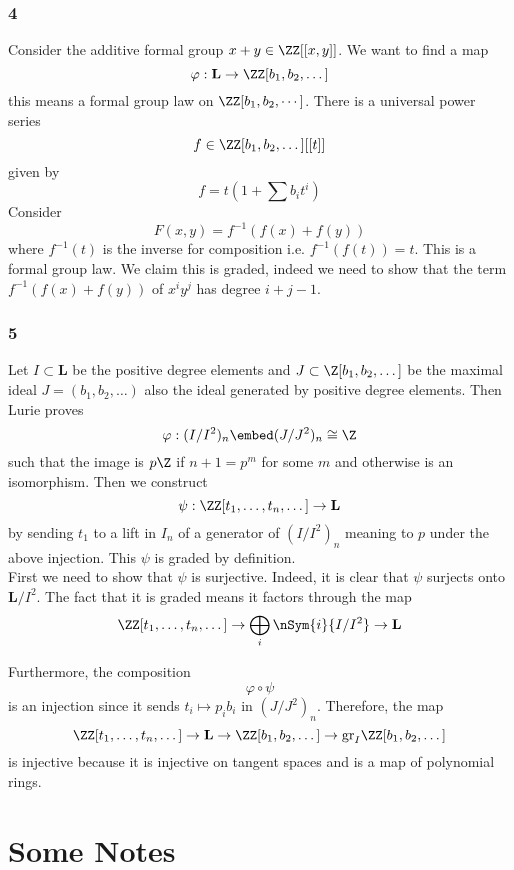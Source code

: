 \documentclass{article}
\newcommand{\LL}{\mathbf{L}}
\begin{document}
\subsubsection{4}

Consider the additive formal group $x + y \in \ZZ[[x,y]]$. We want to find a map
\[ \varphi : \LL \to \ZZ[b_1, b_2, \dots] \]
this means a formal group law on $\ZZ[b_1, b_2, \cdots]$. There is a universal power series
\[ f \in \ZZ[b_1, b_2, \dots][[t]] \]
given by
\[ f = t(1 + \sum b_i t^i) \]
Consider
\[ F(x,y) = f^{-1}(f(x) + f(y)) \]
where $f^{-1}(t)$ is the inverse for composition i.e. $f^{-1}(f(t)) = t$. This is a formal group law. We claim this is graded, indeed we need to show that the term $f^{-1}(f(x) + f(y))$ of $x^i y^j$ has degree $i + j - 1$.

\subsubsection{5}

Let $I \subset \LL$ be the positive degree elements and $J \subset \Z[b_1, b_2, \dots]$ be the maximal ideal $J = (b_1, b_2, \dots)$ also the ideal generated by positive degree elements. Then Lurie proves
\[ \varphi : (I/I^2)_n \embed (J/J^2)_n \cong \Z \]
such that the image is $p \Z$ if $n + 1 = p^m$ for some $m$ and otherwise is an isomorphism. 
Then we construct
\[ \psi : \ZZ[t_1, \dots, t_n, \dots] \to \LL \]
by sending $t_1$ to a lift in $I_n$ of a generator of $(I/I^2)_n$ meaning to $p$ under the above injection. This $\psi$ is graded by definition.
\bigskip\\
First we need to show that $\psi$ is surjective. Indeed, it is clear that $\psi$ surjects onto $\LL / I^2$. The fact that it is graded means it factors through the map
\[ \ZZ[t_1, \dots, t_n, \dots] \to \bigoplus_i \nSym{i}{I/I^2} \to \LL \]


 Furthermore, the composition
\[ \varphi \circ \psi \]
is an injection since it sends $t_i \mapsto p_i b_i$ in $(J/J^2)_n$. Therefore, the map
\[  \ZZ[t_1, \dots, t_n, \dots] \to \LL \to \ZZ[b_1, b_2, \dots] \to \mathrm{gr}_I \ZZ[b_1, b_2, \dots]  \]
is injective because it is injective on tangent spaces and is a map of polynomial rings. 

\section{Some Notes}
\end{document}
